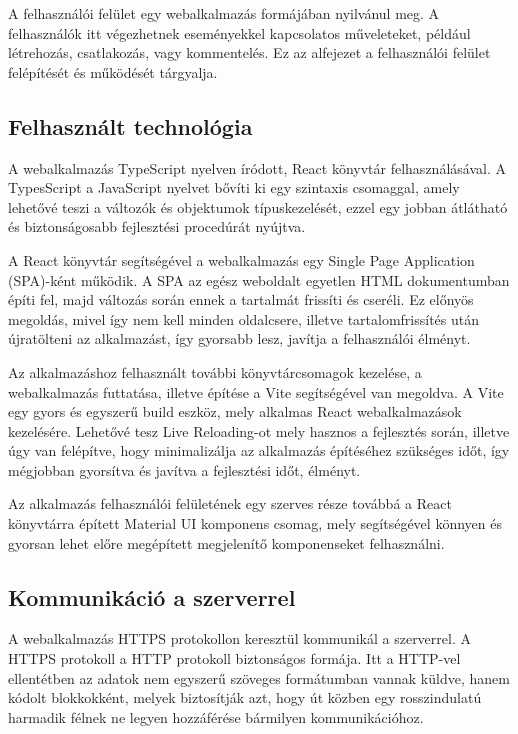 A felhasználói felület egy webalkalmazás formájában nyilvánul meg. A felhasználók itt végezhetnek eseményekkel kapcsolatos műveleteket, például létrehozás, csatlakozás, vagy kommentelés. Ez az alfejezet a felhasználói felület felépítését és működését tárgyalja.

\subsection{Felhasznált technológia}

A webalkalmazás TypeScript\cite{typescriptdocs} nyelven íródott, React\cite{reactdocs} könyvtár felhasználásával.
A TypesScript a JavaScript\cite{javascriptdocsmozilla} nyelvet bővíti ki egy szintaxis csomaggal, amely lehetővé teszi a változók és objektumok típuskezelését, ezzel egy jobban átlátható és biztonságosabb fejlesztési procedúrát nyújtva.

A React könyvtár segítségével a webalkalmazás egy Single Page Application (SPA)-ként\cite{singlepageapplicationdocs} működik.
A SPA az egész weboldalt egyetlen HTML dokumentumban építi fel, majd változás során ennek a tartalmát frissíti és cseréli. Ez előnyös megoldás, mivel így nem kell minden oldalcsere, illetve tartalomfrissítés után újratölteni az alkalmazást, így gyorsabb lesz, javítja a felhasználói élményt.

Az alkalmazáshoz felhasznált további könyvtárcsomagok kezelése, a webalkalmazás futtatása, illetve építése a Vite\cite{vitedocs} segítségével van megoldva.
A Vite egy gyors és egyszerű build eszköz, mely alkalmas React webalkalmazások kezelésére. Lehetővé tesz Live Reloading-ot mely hasznos a fejlesztés során, illetve úgy van felépítve, hogy minimalizálja az alkalmazás építéséhez szükséges időt, így mégjobban gyorsítva és javítva a fejlesztési időt, élményt.

Az alkalmazás felhasználói felületének egy szerves része továbbá a React könyvtárra épített Material UI komponens csomag, mely segítségével könnyen és gyorsan lehet előre megépített megjelenítő komponenseket felhasználni.

\subsection{Kommunikáció a szerverrel}

A webalkalmazás HTTPS protokollon keresztül kommunikál a szerverrel. A HTTPS protokoll a HTTP protokoll biztonságos formája. Itt a HTTP-vel ellentétben az adatok nem egyszerű szöveges formátumban vannak küldve, hanem kódolt blokkokként, melyek biztosítják azt, hogy út közben egy rosszindulatú harmadik félnek ne legyen hozzáférése bármilyen kommunikációhoz.


